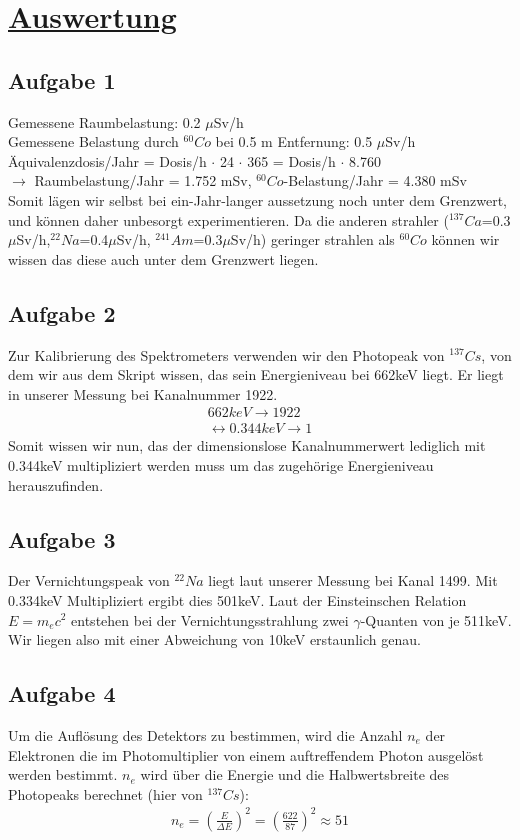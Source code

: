 \documentclass[11pt,a4paper]{article}
\begin{document}
\section{\underline{Auswertung}}
  \subsection{Aufgabe 1}
   Gemessene Raumbelastung: 0.2 $\mu$Sv/h \\
   Gemessene Belastung durch $^{60}{Co}$ bei 0.5 m Entfernung: 0.5 $\mu$Sv/h \\
   \"Aquivalenzdosis/Jahr = Dosis/h $\cdot$ 24 $\cdot$ 365 = Dosis/h $\cdot$ 8.760 \\
   $\rightarrow$ Raumbelastung/Jahr = 1.752 mSv, $^{60}{Co}$-Belastung/Jahr = 4.380 mSv \\
   Somit l\"agen wir selbst bei ein-Jahr-langer aussetzung noch unter dem Grenzwert,
   und k\"onnen daher unbesorgt experimentieren. Da die anderen strahler
   ($^{137}{Ca}$=0.3$\mu$Sv/h,$^{22}{Na}$=0.4$\mu$Sv/h, $^{241}{Am}$=0.3$\mu$Sv/h) geringer strahlen als
   $^{60}{Co}$ k\"onnen wir wissen das diese auch unter dem Grenzwert liegen.
  \subsection{Aufgabe 2}
   Zur Kalibrierung des Spektrometers verwenden wir den Photopeak von $^{137}{Cs}$, von dem wir aus dem Skript wissen,
   das sein Energieniveau bei 662keV liegt. Er liegt in unserer Messung bei Kanalnummer 1922. 
    \begin{align}
     662keV \rightarrow 1922 \\
     \leftrightarrow 0.344keV \rightarrow 1
    \end{align}
   Somit wissen wir nun, das der dimensionslose Kanalnummerwert lediglich mit 0.344keV multipliziert werden muss um das zugeh\"orige Energieniveau
   herauszufinden.
  \subsection{Aufgabe 3}
   Der Vernichtungspeak von $^{22}{Na}$ liegt laut unserer Messung bei Kanal 1499. Mit 0.334keV Multipliziert ergibt dies 501keV. Laut der Einsteinschen Relation
   $E={m}_{e}c^2$ entstehen bei der Vernichtungsstrahlung zwei $\gamma$-Quanten von je 511keV. Wir liegen also mit einer Abweichung von 10keV erstaunlich genau.
  \subsection{Aufgabe 4}
   Um die Aufl\"osung des Detektors zu bestimmen, wird die Anzahl ${n}_{e}$ der Elektronen die im
   Photomultiplier von einem auftreffendem Photon ausgel\"ost werden bestimmt. ${n}_{e}$ wird \"uber die 
   Energie und die Halbwertsbreite des Photopeaks berechnet (hier von $^{137}{Cs}$):
    \begin{align}
     {n}_{e} = {\left(\frac{E}{{\Delta}E}\right)}^{2} = {\left(\frac{622}{87}\right)}^{2} \approx
     51
    \end{align}
\end{document}
